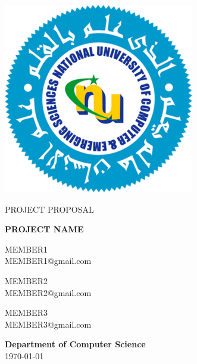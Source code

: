 \documentclass[a4paper, 12pt]{article}
\begin{document}
\begin{titlepage}

\begin{center}
   \includegraphics[scale=0.4]{Images/fast_nu.png} 
\end{center}
   
\thispagestyle{empty}

\center

\textsc{\large PROJECT PROPOSAL}

\vspace{0.5in}

\noindent\makebox[\linewidth]{\rule{\linewidth}{1.2pt}}
\textsc{ \textbf{\large PROJECT NAME }}
\noindent\makebox[\linewidth]{\rule{\linewidth}{1.2pt}}

\vspace{0.5in}

\begin{minipage}{0.3\textwidth}
    \begin{flushleft}
        MEMBER1 \\
        MEMBER1@gmail.com
    \end{flushleft}
\end{minipage}
\begin{minipage}{0.3\textwidth}
    \begin{center}
        MEMBER2 \\
        MEMBER2@gmail.com
    \end{center}
\end{minipage}
\begin{minipage}{0.3\textwidth}
    \begin{flushright}
        MEMBER3 \\
        MEMBER3@gmail.com
    \end{flushright}
\end{minipage}

\vspace{2in}

\textbf{\large Department of Computer Science} \\

\today

\end{titlepage}
\end{document}
